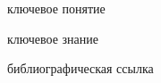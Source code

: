 {\label{sec_ecosystem_automation_principles}} 

\begin{SCn}

\bigskip

\begin{scnrelfromlist}{ключевое понятие}
\end{scnrelfromlist}

\bigskip

\begin{scnrelfromlist}{ключевое знание}
\end{scnrelfromlist}

\bigskip

\begin{scnrelfromlist}{библиографическая ссылка}
\end{scnrelfromlist}

\end{SCn}    
